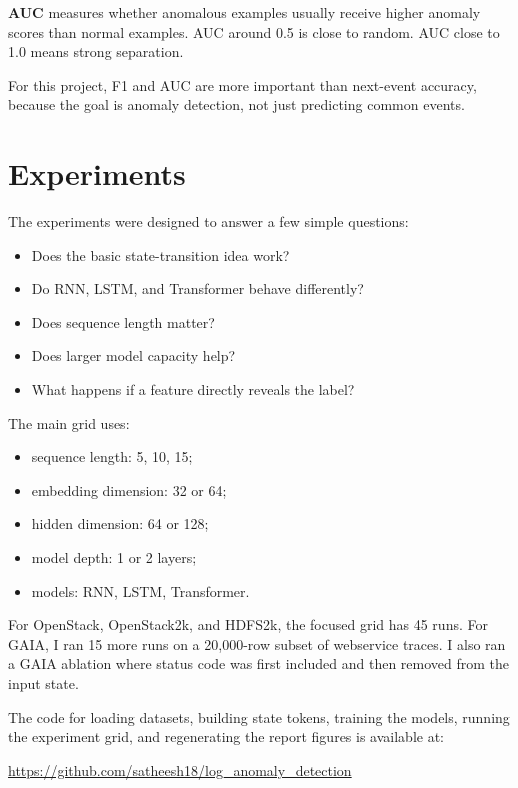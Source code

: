 \documentclass[11pt]{article}
\begin{document}
\textbf{AUC} measures whether anomalous examples usually receive higher anomaly scores than normal examples. AUC around 0.5 is close to random. AUC close to 1.0 means strong separation.

For this project, F1 and AUC are more important than next-event accuracy, because the goal is anomaly detection, not just predicting common events.

\section{Experiments}

The experiments were designed to answer a few simple questions:

\begin{itemize}
    \item Does the basic state-transition idea work?
    \item Do RNN, LSTM, and Transformer behave differently?
    \item Does sequence length matter?
    \item Does larger model capacity help?
    \item What happens if a feature directly reveals the label?
\end{itemize}

The main grid uses:

\begin{itemize}
    \item sequence length: 5, 10, 15;
    \item embedding dimension: 32 or 64;
    \item hidden dimension: 64 or 128;
    \item model depth: 1 or 2 layers;
    \item models: RNN, LSTM, Transformer.
\end{itemize}

For OpenStack, OpenStack2k, and HDFS2k, the focused grid has 45 runs. For GAIA, I ran 15 more runs on a 20,000-row subset of webservice traces. I also ran a GAIA ablation where status code was first included and then removed from the input state.

The code for loading datasets, building state tokens, training the models, running the experiment grid, and regenerating the report figures is available at:

\begin{center}
\url{https://github.com/satheesh18/log_anomaly_detection}
\end{center}
\end{document}

